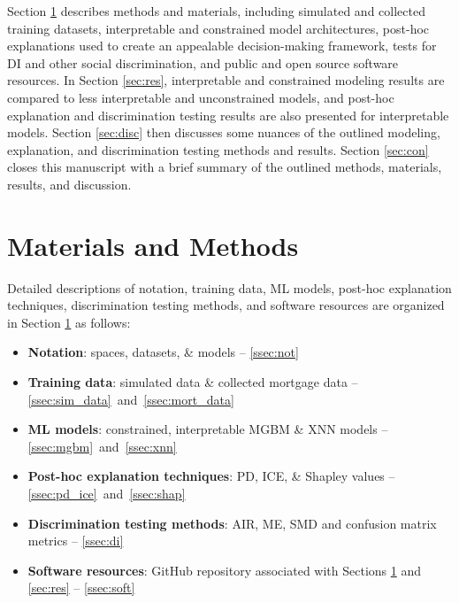 \documentclass[information,article,submit,moreauthors,pdftex]{definitions/mdpi}
\begin{document}
Section \ref{sec:m_and_m} describes methods and materials, including simulated and collected training datasets, interpretable and constrained model architectures, post-hoc explanations used to create an appealable decision-making framework, tests for DI and other social discrimination, and public and open source software resources. In Section \ref{sec:res}, interpretable and constrained modeling results are compared to less interpretable and unconstrained models, and post-hoc explanation and discrimination testing results are also presented for interpretable models. Section \ref{sec:disc} then discusses some nuances of the outlined modeling, explanation, and discrimination testing methods and results. Section \ref{sec:con} closes this manuscript with a brief summary of the outlined methods, materials, results, and discussion.

\section{Materials and Methods}\label{sec:m_and_m}

Detailed descriptions of notation, training data, ML models, post-hoc explanation techniques, discrimination testing methods, and software resources are organized in Section \ref{sec:m_and_m} as follows:

\begin{itemize}[leftmargin=*,labelsep=5.8mm]
	\item \textbf{Notation}: spaces, datasets, \& models -- \textsection\ref{ssec:not}
	\item \textbf{Training data}: simulated data \& collected mortgage data -- \textsection\ref{ssec:sim_data}~and~\textsection\ref{ssec:mort_data}
	\item \textbf{ML models}: constrained, interpretable MGBM \& XNN models  -- \textsection\ref{ssec:mgbm}~and~\textsection\ref{ssec:xnn}
	\item \textbf{Post-hoc explanation techniques}: PD, ICE, \& Shapley values -- \textsection\ref{ssec:pd_ice}~and~\textsection\ref{ssec:shap}
	\item \textbf{Discrimination testing methods}: AIR, ME, SMD and confusion matrix metrics -- \textsection\ref{ssec:di}
	\item \textbf{Software resources}: GitHub repository associated with Sections \ref{sec:m_and_m} and \ref{sec:res} -- \textsection\ref{ssec:soft}
\end{itemize}
\end{document}

